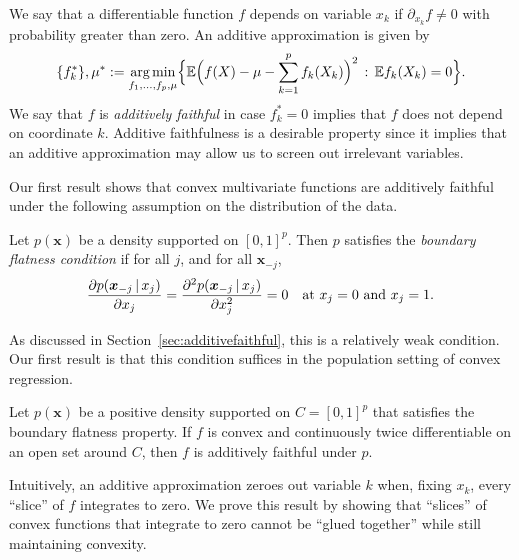 We say that a differentiable function $f$ depends on variable $x_k$ if
$\partial_{x_k} f \neq 0$ with probability greater than zero.  An additive approximation is given by
\begin{equation}
\{f_k^*\}, \mu^* := \mathop{\text{\rm arg\,min}}_{f_1,\ldots, f_p, \mu} \Bigl\{ 
             {\mathbb E} \Bigl( f(X) - \mu - \sum_{k=1}^p f_k(X_k)\Bigr)^2 
         \,:\, {\mathbb E} f_k(X_k) = 0 \Bigr\}.
\end{equation}
We say that $f$ is \textit{additively faithful} in case $f^*_k = 0$
implies that $f$ does not depend on coordinate $k$.
Additive faithfulness is a desirable property
since it implies that an additive approximation may allow us to 
screen out irrelevant variables.

Our first result shows that convex multivariate functions are
additively faithful
under the following assumption on the distribution of the data.
\begin{definition}
  Let $p(\mathbf{x})$ be a density supported on $[0,1]^p$.  Then $p$
  satisfies the \emph{boundary flatness condition} if for all $j$, and
  for all $\mathbf{x}_{-j}$,
\[
\frac{\partial p(\mbox{\boldmath $x$}_{-j} {\,|\,} x_j)}{\partial x_j}  =  
\frac{\partial^2 p(\mbox{\boldmath $x$}_{-j} {\,|\,} x_j)}{\partial x_j^2} = 0
\quad \textrm{at $x_j = 0$ and $x_j = 1$}.
\]
\end{definition}

As discussed in Section~\ref{sec:additivefaithful}, this is a relatively weak condition. 
Our first result is that this condition suffices in the population
setting of convex regression.

\begin{stheorem}
  Let $p(\mathbf{x})$ be a positive density supported on $C=[0,1]^p$ that
  satisfies the boundary flatness property. If $f$ is convex and continuously twice
  differentiable on an open set around $C$, then $f$ is additively faithful under $p$.
\end{stheorem}


Intuitively, an additive approximation zeroes out variable $k$ when, fixing $x_k$, every
``slice'' of $f$ integrates to zero. We prove this result
by showing that ``slices'' of convex
functions that integrate to zero cannot be ``glued together'' while
still maintaining convexity.

